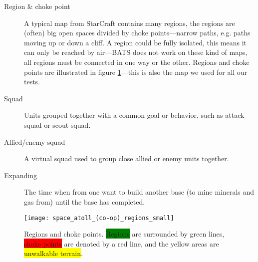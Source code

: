 \begin{description}
	\item[Region \& choke point] A typical map from StarCraft contains many regions, the regions are (often) big open spaces divided by choke points—narrow paths, e.g. paths moving up or down a cliff. A region could be fully isolated, this means it can only be reached by air—BATS does not work on these kind of maps, all regions must be connected in one way or the other. Regions and choke points are illustrated in figure \ref{fig:region_and_choke_points}—this is also the map we used for all our tests.
	\item[Squad] Units grouped together with a common goal or behavior, such as attack squad or scout squad.
	\item[Allied/enemy squad] A virtual squad used to group close allied or enemy units together.
	\item[Expanding] The time when from one want to build another base (to mine minerals and gas from) until the base has completed.
\end{description}
\begin{figure}[htb]
	\centering
	\texttt{[image: space\_atoll\_(co-op)\_regions\_small]}
	\caption[Regions and choke points]{Regions and choke points. \colorbox{green}{Regions} are surrounded by green lines, \colorbox{Red}{choke points} are denoted by a red line, and the yellow areas are \colorbox{yellow}{unwalkable terrain}.}
	\label{fig:region_and_choke_points}
\end{figure}